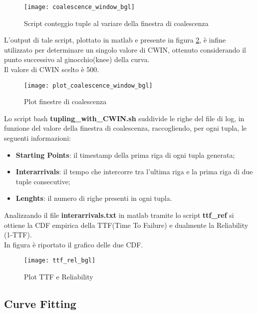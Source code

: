 \begin{figure}[!htbp]
  \centering
  \texttt{[image: coalescence\_window\_bgl]}
  \caption{Script conteggio tuple al variare della finestra di coalescenza}
  \label{coalescence_window_bgl}
\end{figure}

L'output di tale script, plottato in matlab e presente in figura \ref{plot_coalescence_window_bgl},
è infine utilizzato per determinare un singolo valore di CWIN, ottenuto
considerando il punto successivo al ginocchio(knee) della curva.\\
Il valore di CWIN scelto è 500.\\
\begin{figure}[!htbp]
  \texttt{[image: plot\_coalescence\_window\_bgl]}
  \caption{Plot finestre di coalescenza}
  \label{plot_coalescence_window_bgl}
\end{figure}

Lo script bash \textbf{tupling\_with\_CWIN.sh} suddivide le righe del file di log,
in funzione del valore della finestra di coalescenza, raccogliendo, per ogni tupla,
le seguenti informazioni:

\begin{itemize}
  \item \textbf{Starting Points}: il timestamp della prima riga di ogni tupla generata;
  \item \textbf{Interarrivals}: il tempo che intercorre tra l'ultima riga e la
  prima riga di due tuple consecutive;
  \item \textbf{Lenghts}: il numero di righe presenti in ogni tupla.
\end{itemize}

Analizzando il file \textbf{interarrivals.txt} in matlab tramite lo script \textbf{ttf\_ref}
si ottiene la CDF empirica della TTF(Time To Failure) e dualmente la Reliability (1-TTF).\\
In figura è riportato il grafico delle due CDF.

\begin{figure}[!htbp]
  \centering
  \texttt{[image: ttf\_rel\_bgl]}
  \caption{Plot TTF e Reliability}
  \label{ttf_rel_bgl}
\end{figure}


\subsection{Curve Fitting}

